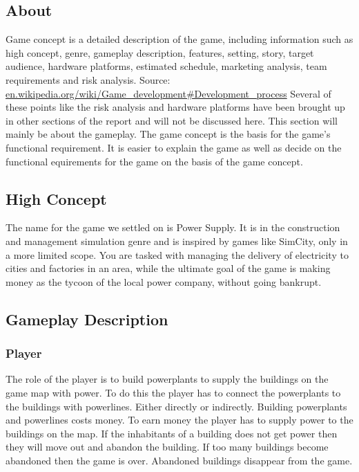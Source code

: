 \subsection{About}
Game concept is a detailed description of the game, including information such as high concept, genre,
gameplay description, features, setting, story, target audience, hardware platforms, estimated schedule,
marketing analysis, team requirements and risk analysis. Source: 
\url{en.wikipedia.org/wiki/Game_development#Development_process}
Several of these points like the risk analysis and hardware platforms have been brought up in other 
sections of the report and will not be discussed here. This section will mainly be about the gameplay. 
The game concept is the basis for the game's functional requirement. It is easier to explain the game 
as well as decide on the functional equirements for the game on the basis of the game concept. 

\subsection{High Concept}
The name for the game we settled on is Power Supply. It is in the construction and management 
simulation genre and is inspired by games like SimCity, only in a more limited scope. You are 
tasked with managing the delivery of electricity to cities and factories in an area, while the 
ultimate goal of the game is making money as the tycoon of the local power company, without going 
bankrupt.

\subsection{Gameplay Description}

\subsubsection{Player}
The role of the player is to build powerplants to supply the buildings on the game map with power. 
To do this the player has to connect the powerplants to the buildings with powerlines. Either directly
or indirectly. Building powerplants and powerlines costs money. To earn money the player has to supply
power to the buildings on the map. If the inhabitants of a building does not get power then they will
move out and abandon the building. If too many buildings become abandoned then the game is over.
Abandoned buildings disappear from the game.


